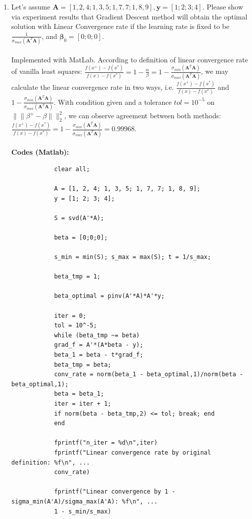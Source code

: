 \documentclass[11pt]{article}
\newcommand{\mtx}[1]{\mathbf{#1}}
\newcommand{\vct}[1]{\mathbf{#1}}
\def \mA {\mtx{A}}
\def \vy {\vct{y}}
\begin{document}
\begin{enumerate}
		
		\item Let's assume $\mA=[1, 2, 4;1, 3, 5; 1, 7, 7; 1, 8, 9], \vy=[1;2;3;4]$. Please show via experiment results that Gradient Descent method will obtain the optimal solution with  Linear Convergence rate if the learning rate is fixed to be $\frac{1}{\sigma_{max}(\mA^T\mA)}$, and $\bm{\beta}_0=[0;0;0]$.	\\\\
		Implemented with MatLab.
		According to definition of linear convergence rate of vanilla least squares: $\frac{f(x^+)-f(x^*)}{f(x)-f(x^*)}=1-\frac{\alpha}{\beta}=1-\frac{\sigma_{min}(\mA^T\mA)}{\sigma_{max}(\mA^T\mA)}$, we may calculate the linear convergence rate in two ways, i.e. $\frac{f(x^+)-f(x^*)}{f(x)-f(x^*)}$ and $1-\frac{\sigma_{min}(\mA^T\mA)}{\sigma_{max}(\mA^T\mA)}$. With condition given and a tolerance $tol=10^{-5}$ on $\|\|\beta^{+}-\beta\|\|_2^2$, we can observe agreement between both methods: $\frac{f(x^+)-f(x^*)}{f(x)-f(x^*)} = 1-\frac{\sigma_{min}(\mA^T\mA)}{\sigma_{max}(\mA^T\mA)} = 0.99968$.\\ \\ 
		\textbf{Codes (Matlab): }\\
		\begin{verbatim}
			clear all;
			
			A = [1, 2, 4; 1, 3, 5; 1, 7, 7; 1, 8, 9];
			y = [1; 2; 3; 4];
			
			S = svd(A'*A);
			
			beta = [0;0;0];
			
			s_min = min(S); s_max = max(S); t = 1/s_max;
			
			beta_tmp = 1;
			
			beta_optimal = pinv(A'*A)*A'*y;
			
			iter = 0;
			tol = 10^-5;
			while (beta_tmp ~= beta) 
			grad_f = A'*(A*beta - y);
			beta_1 = beta - t*grad_f;
			beta_tmp = beta;
			conv_rate = norm(beta_1 - beta_optimal,1)/norm(beta - beta_optimal,1);
			beta = beta_1;
			iter = iter + 1;
			if norm(beta - beta_tmp,2) <= tol; break; end
			end
			
			fprintf("n_iter = %d\n",iter)
			fprintf("Linear convergence rate by original definition: %f\n", ...
			conv_rate)
			
			fprintf("Linear convergence by 1 - sigma_min(A'A)/sigma_max(A'A): %f\n", ...
			1 - s_min/s_max)
		\end{verbatim}\\ \\
		

\end{enumerate}
\end{document}
